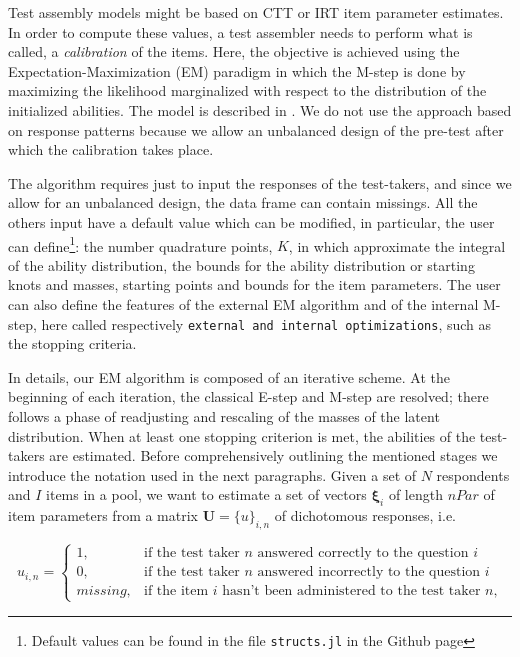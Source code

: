 Test assembly models might be based on CTT or IRT item parameter estimates. In order to compute these values, a test assembler needs to perform what is called, a \emph{calibration} of the items. Here, the objective is achieved using the Expectation-Maximization (EM) paradigm in which the M-step is done by maximizing the likelihood marginalized with respect to the distribution of the initialized abilities. The model is described in \textcite{bock1981marginal}. We do not use the approach based on response patterns because we allow an unbalanced design of the pre-test after which the calibration takes place.

The algorithm requires just to input the responses of the test-takers, and since we allow for an unbalanced design, the data frame can contain missings. All the others input have a default value which can be  modified, in particular, the user can define\footnote{Default values can be found in the file \texttt{structs.jl} in the Github page}: the number quadrature points, $K$, in which approximate the integral of the ability distribution, the bounds for the ability distribution or starting knots and masses, starting points and bounds for the item parameters. The user can also define the features of the external EM algorithm and of the internal M-step, here called respectively \texttt{external and internal optimizations}, such as the stopping criteria. 

In details, our EM algorithm is composed of an iterative scheme. At the beginning of each iteration, the classical E-step and M-step are resolved; there follows a phase of readjusting and rescaling of the masses of the latent distribution. When at least one stopping criterion is met, the abilities of the test-takers are estimated. Before comprehensively outlining the mentioned stages we introduce the notation used in the next paragraphs.
Given a set of $N$ respondents and $I$ items in a pool, we want to estimate a set of vectors $\boldsymbol{\xi}_i$ of length $nPar$ of item parameters from a matrix $\mathbf{U}=\{u\}_{i,n}$ of dichotomous responses, i.e.

$$u_{i,n}= 
\begin{cases} 
1, & \mbox{if the test taker $n$ answered correctly to the question $i$}  \\
0, & \mbox{if the test taker $n$ answered incorrectly to the question $i$}\\
missing, & \mbox{if the item $i$ hasn't been administered to the test taker $n$,}
\end{cases}
$$

